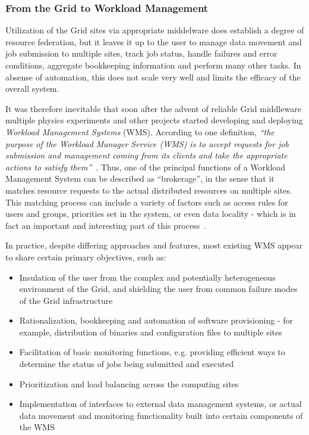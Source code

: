 %

\subsubsection{From the Grid to Workload Management}
\label{from_grid_to_workload}
Utilization of the Grid sites via appropriate middelware does establish a degree of resource federation, but it leaves it up to the user to manage data movement and job submission to multiple sites,
track job status, handle failures and error conditions, aggregate bookkeeping information and perform many other tasks. In absense of automation, this does not scale very well and limits the efficacy
of the overall system.

It was therefore inevitable that soon after the advent of reliable Grid middleware multiple physics experiments and other projects started developing and deploying \textit{Workload Management Systems} (WMS).
 According to one definition,
\textit{``the purpose of the Workload Manager Service (WMS) is to accept requests for job submission and management coming from its clients and take the appropriate actions to satisfy them''}~\cite{egee_user_guide}.
Thus, one of the principal functions of a Workload Management System can be described as ``brokerage'', in the sense that it matches resource requests to the actual distributed resources
on multiple sites. This matching process can include a variety of factors such as access rules for users and groups, priorities set in the system, or even data locality - which is in fact an important and interesting part of this process~\cite{panda_chep10}.

In practice, despite differing approaches and features, most existing WMS appear to share certain primary objectives, such as:
\begin{itemize}
\item{Insulation of the user from the complex and potentially heterogeneous environment of the Grid, and shielding the user from common failure modes of the Grid infrastructure}
\item{Rationalization, bookkeeping and automation of software provisioning - for example, distribution of binaries and configuration files to multiple sites}
\item{Facilitation of basic monitoring functions, e.g. providing efficient ways to determine the status of jobs being submitted and executed}
\item{Prioritization and load balancing across the computing sites}
\item{Implementation of interfaces to external data management systems, or actual data movement and monitoring functionality built into certain components of the WMS}
\end{itemize}



